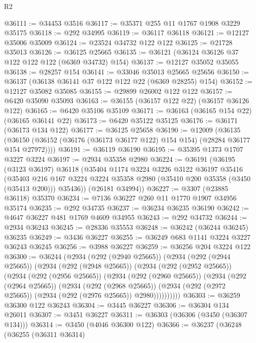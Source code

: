 \begin{lexlean}{R2}
\begin{coremodule}
@36111 := @34453 @3516
@36117 := @35371 @255 @11 @1767 @1908 @3229 @35175
@36118 := @292 @34995
@36119 := @36117 @36118
@36121 := @12127 @35006 @35009
@36124 := @23524 @34732 @122 @122
@36125 := @21728 @35013
@36126 := @36125 @25665
@36135 := @36121 (@36124 @36126 @37 @122 @122 @122 (@6369 @34732) @154)
@36137 := @12127 @35052 @35055
@36138 := @28257 @154
@36141 := @33046 @35013 @25665 @25656
@36150 := @36137 (@36138 @36141 @37 @122 @122 @22 (@6369 @28255) @154)
@36152 := @12127 @35082 @35085
@36155 := @29899 @26002 @122 @122
@36157 := @6420 @35090 @35093
@36163 := @36155 (@36157 @122 @22) (@36157 @36126 @122)
@36165 := @6420 @35106 @35109
@36171 := @36163 (@36165 @154 @22) (@36165 @36141 @22)
@36173 := @6420 @35122 @35125
@36176 := @36171 (@36173 @134 @122)
@36177 := @36125 @25658
@36190 := @12009
    (@36135 (@36150 (@36152 (@36176 (@36173 @36177 @122) @154 @154) (@28284 @36177 @154 @27972))))
@36191 := @36119 @36190
@36195 := @35395 @1373 @1707 @3227 @3224
@36197 := @2934 @35358 @2980
@36224 := @36191
    (@36195
      (@3123 @36197)
      @36118
      (@35404
        @1174
        @3224
        @3226
        @3122
        @36197
        @35416
        (@35403
          @216
          @167
          @3224
          @3224
          @35358
          @2980
          (@35410 @200 @35358 (@3450 (@35413 @200)))
          @35436))
      (@26181 @34994))
@36227 := @3307 (@23885 @36118) @35370
@36234 := @7136 @36227 @260 @11 @1770 @1907 @34956 @35174
@36235 := @292 @34735
@36237 := @36234 @36235 @36190
@36242 := @4647 @36227 @481 @1769 @4609 @34955
@36243 := @292 @34732
@36244 := @2934 @36243
@36245 := @28336 @35553
@36248 := @36242 (@36244 @36245) @36235
@36249 := @3436 @36227
@36255 := @36249 @683 @1141 @3224 @3227 @36243 @36245
@36256 := @3988 @36227
@36259 := @36256 @204 @3224 @122
@36300 := @36244
    (@2934
      (@292 (@2940 @25665))
      (@2934
        (@292 (@2944 @25665))
        (@2934
          (@292 (@2948 @25665))
          (@2934
            (@292 (@2952 @25665))
            (@2934
              (@292 (@2956 @25665))
              (@2934
                (@292 (@2960 @25665))
                (@2934
                  (@292 (@2964 @25665))
                  (@2934
                    (@292 (@2968 @25665))
                    (@2934 (@292 (@2972 @25665)) (@2934 (@292 (@2976 @25665)) @2980))))))))))
@36303 := @36259 @36300 @122 @36243
@36304 := @3445 @36227
@36306 := @36304 @134 @26011
@36307 := @3451 @36227
@36311 := @36303 (@36306 (@3450 (@36307 @134)))
@36314 := @3450 (@4046 @36300 @122)
@36366 := @36237
    (@36248
      (@36255
        (@36311 @36314)

\end{coremodule}
\end{lexlean}
